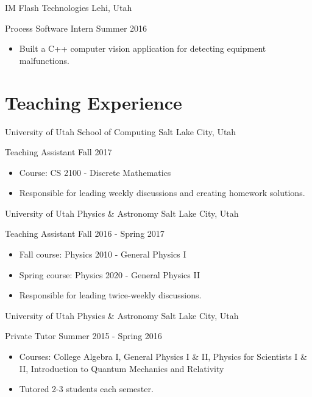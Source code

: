 \blockskip

\begin{tab1} IM Flash Technologies \> Lehi, Utah \end{tab1}
\begin{tab2} Process Software Intern \> Summer 2016 \end{tab2}
\begin{itemize}
    \item Built a C++ computer vision application for detecting equipment malfunctions.
\end{itemize}


\section*{Teaching Experience}

\begin{tab1} University of Utah School of Computing \> Salt Lake City, Utah \end{tab1}
\begin{tab2} Teaching Assistant \> Fall 2017 \end{tab2}
\begin{itemize}
    \item Course: CS 2100 - Discrete Mathematics
    \item Responsible for leading weekly discussions and creating homework solutions.
\end{itemize}

\blockskip

\begin{tab1} University of Utah Physics \& Astronomy \> Salt Lake City, Utah \end{tab1}
\begin{tab2} Teaching Assistant \> Fall 2016 - Spring 2017 \end{tab2}
\begin{itemize}
    \item Fall course: Physics 2010 - General Physics I
    \item Spring course: Physics 2020 - General Physics II
    \item Responsible for leading twice-weekly discussions.
\end{itemize}

\blockskip

\begin{tab1} University of Utah Physics \& Astronomy \> Salt Lake City, Utah \end{tab1}
\begin{tab2} Private Tutor \> Summer 2015 - Spring 2016 \end{tab2}
\begin{itemize}
    \item Courses: College Algebra I, General Physics I \& II, Physics for Scientists I \& II, Introduction to Quantum Mechanics and Relativity
    \item Tutored 2-3 students each semester.
\end{itemize}


